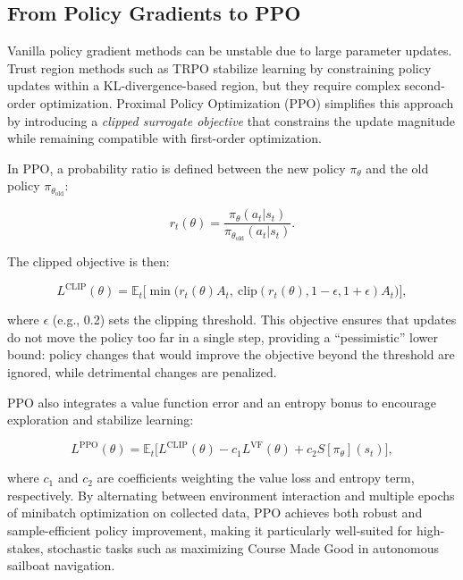 \subsection{From Policy Gradients to PPO}

Vanilla policy gradient methods can be unstable due to large parameter updates. Trust region methods such as TRPO stabilize learning by constraining policy updates within a KL-divergence-based region, but they require complex second-order optimization. Proximal Policy Optimization (PPO) simplifies this approach by introducing a \emph{clipped surrogate objective} that constrains the update magnitude while remaining compatible with first-order optimization.  

In PPO, a probability ratio is defined between the new policy $\pi_\theta$ and the old policy $\pi_{\theta_\text{old}}$:

\begin{equation}
r_t(\theta) = \frac{\pi_\theta(a_t|s_t)}{\pi_{\theta_\text{old}}(a_t|s_t)}.
\end{equation}

The clipped objective is then:

\begin{equation}
L^\text{CLIP}(\theta) = \mathbb{E}_t \Big[ \min \big( r_t(\theta) A_t, \ \text{clip}(r_t(\theta), 1-\epsilon, 1+\epsilon) A_t \big) \Big],
\end{equation}

where $\epsilon$ (e.g., 0.2) sets the clipping threshold. This objective ensures that updates do not move the policy too far in a single step, providing a “pessimistic” lower bound: policy changes that would improve the objective beyond the threshold are ignored, while detrimental changes are penalized.

PPO also integrates a value function error and an entropy bonus to encourage exploration and stabilize learning:

\begin{equation}
L^{\text{PPO}}(\theta) = \mathbb{E}_t \Big[ L^\text{CLIP}(\theta) - c_1 L^\text{VF}(\theta) + c_2 S[\pi_\theta](s_t) \Big],
\end{equation}

where $c_1$ and $c_2$ are coefficients weighting the value loss and entropy term, respectively. By alternating between environment interaction and multiple epochs of minibatch optimization on collected data, PPO achieves both robust and sample-efficient policy improvement, making it particularly well-suited for high-stakes, stochastic tasks such as maximizing Course Made Good in autonomous sailboat navigation.




